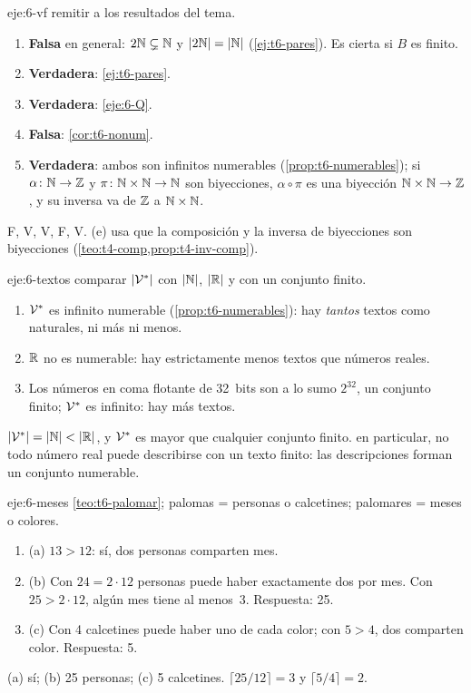 \begin{solucion}{eje:6-vf}
\planteamiento remitir a los resultados del tema.
\pasos
\begin{enumerate}[label=(\alph*)]
  \item \textbf{Falsa} en general: $2\mathbb{N}\subsetneq\mathbb{N}$ y $\lvert2\mathbb{N}\rvert=\lvert\mathbb{N}\rvert$ (\cref{ej:t6-pares}). Es cierta si $B$ es finito.
  \item \textbf{Verdadera}: \cref{ej:t6-pares}.
  \item \textbf{Verdadera}: \cref{eje:6-Q}.
  \item \textbf{Falsa}: \cref{cor:t6-nonum}.
  \item \textbf{Verdadera}: ambos son infinitos numerables (\cref{prop:t6-numerables}); si $\alpha\colon\mathbb{N}\to\mathbb{Z}$ y $\pi\colon\mathbb{N}\times\mathbb{N}\to\mathbb{N}$ son biyecciones, $\alpha\circ\pi$ es una biyección $\mathbb{N}\times\mathbb{N}\to\mathbb{Z}$, y su inversa va de $\mathbb{Z}$ a $\mathbb{N}\times\mathbb{N}$.
\end{enumerate}
\resultado F, V, V, F, V.
\comprobacion (e) usa que la composición y la inversa de biyecciones son biyecciones (\cref{teo:t4-comp,prop:t4-inv-comp}).
\end{solucion}

\begin{solucion}{eje:6-textos}
\planteamiento comparar $\lvert\mathcal{V}^{*}\rvert$ con $\lvert\mathbb{N}\rvert$, $\lvert\mathbb{R}\rvert$ y con un conjunto finito.
\pasos
\begin{enumerate}[label=\arabic*.]
  \item $\mathcal{V}^{*}$ es infinito numerable (\cref{prop:t6-numerables}): hay \emph{tantos} textos como naturales, ni más ni menos.
  \item $\mathbb{R}$ no es numerable: hay estrictamente menos textos que números reales.
  \item Los números en coma flotante de 32~bits son a lo sumo $2^{32}$, un conjunto finito; $\mathcal{V}^{*}$ es infinito: hay más textos.
\end{enumerate}
\resultado $\lvert\mathcal{V}^{*}\rvert=\lvert\mathbb{N}\rvert<\lvert\mathbb{R}\rvert$, y $\mathcal{V}^{*}$ es mayor que cualquier conjunto finito.
\comprobacion en particular, no todo número real puede describirse con un texto finito: las descripciones forman un conjunto numerable.
\end{solucion}

\begin{solucion}{eje:6-meses}
\planteamiento \cref{teo:t6-palomar}; palomas = personas o calcetines; palomares = meses o colores.
\pasos
\begin{enumerate}[label=\arabic*.]
  \item (a) $13>12$: sí, dos personas comparten mes.
  \item (b) Con $24=2\cdot12$ personas puede haber exactamente dos por mes. Con $25>2\cdot12$, algún mes tiene al menos~3. Respuesta: 25.
  \item (c) Con 4 calcetines puede haber uno de cada color; con $5>4$, dos comparten color. Respuesta: 5.
\end{enumerate}
\resultado (a) sí; (b) 25 personas; (c) 5 calcetines.
\comprobacion $\lceil25/12\rceil=3$ y $\lceil5/4\rceil=2$.
\end{solucion}

